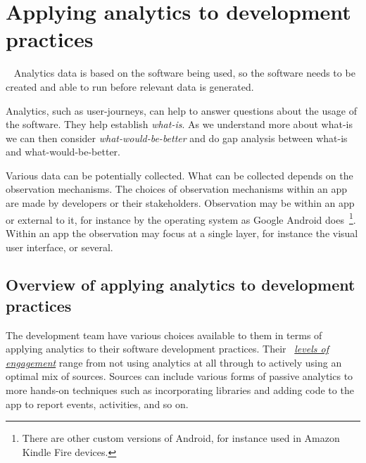 \chapter{Applying analytics to development practices}~\label{chapter-applying-analytics-to-development-practices}
Analytics data is based on the software being used, so the software needs to be created and able to run before relevant data is generated.

Analytics, such as user-journeys, can help to answer questions about the usage of the software. They help establish \emph{what-is}. As we understand more about what-is we can then consider \emph{what-would-be-better} and do gap analysis between what-is and what-would-be-better.

Various data can be potentially collected. What can be collected depends on the observation mechanisms. The choices of observation mechanisms within an app are made by developers or their stakeholders. Observation may be within an app or external to it, for instance by the operating system as Google Android does~\footnote{There are other custom versions of Android, for instance used in Amazon Kindle Fire devices.}. Within an app the observation may focus at a single layer, for instance the visual user interface, or several.


\section{Overview of applying analytics to development practices}
The development team have various choices available to them in terms of applying analytics to their software development practices. Their ~\href{subsection-levels-of-engagement}{\emph{levels of engagement}} range from not using analytics at all through to actively using an optimal mix of sources. 
Sources can include various forms of passive analytics to more hands-on techniques such as incorporating libraries and adding code to the app to report events, activities, and so on.

